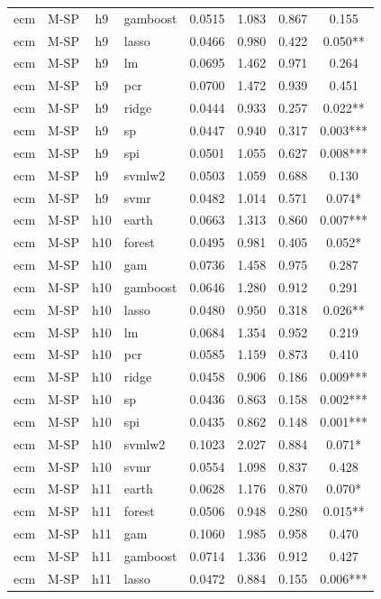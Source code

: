 \begin{ThreePartTable}
\begin{longtable}[t]{llclcccc}
ecm & M-SP & h9 & gamboost & 0.0515 & 1.083 & 0.867 & 0.155\\
ecm & M-SP & h9 & lasso & 0.0466 & 0.980 & 0.422 & 0.050**\\
ecm & M-SP & h9 & lm & 0.0695 & 1.462 & 0.971 & 0.264\\
ecm & M-SP & h9 & pcr & 0.0700 & 1.472 & 0.939 & 0.451\\
ecm & M-SP & h9 & ridge & 0.0444 & 0.933 & 0.257 & 0.022**\\
ecm & M-SP & h9 & sp & 0.0447 & 0.940 & 0.317 & 0.003***\\
ecm & M-SP & h9 & spi & 0.0501 & 1.055 & 0.627 & 0.008***\\
ecm & M-SP & h9 & svmlw2 & 0.0503 & 1.059 & 0.688 & 0.130\\
ecm & M-SP & h9 & svmr & 0.0482 & 1.014 & 0.571 & 0.074*\\
\addlinespace
ecm & M-SP & h10 & earth & 0.0663 & 1.313 & 0.860 & 0.007***\\
ecm & M-SP & h10 & forest & 0.0495 & 0.981 & 0.405 & 0.052*\\
ecm & M-SP & h10 & gam & 0.0736 & 1.458 & 0.975 & 0.287\\
ecm & M-SP & h10 & gamboost & 0.0646 & 1.280 & 0.912 & 0.291\\
ecm & M-SP & h10 & lasso & 0.0480 & 0.950 & 0.318 & 0.026**\\
ecm & M-SP & h10 & lm & 0.0684 & 1.354 & 0.952 & 0.219\\
ecm & M-SP & h10 & pcr & 0.0585 & 1.159 & 0.873 & 0.410\\
ecm & M-SP & h10 & ridge & 0.0458 & 0.906 & 0.186 & 0.009***\\
ecm & M-SP & h10 & sp & 0.0436 & 0.863 & 0.158 & 0.002***\\
ecm & M-SP & h10 & spi & 0.0435 & 0.862 & 0.148 & 0.001***\\
ecm & M-SP & h10 & svmlw2 & 0.1023 & 2.027 & 0.884 & 0.071*\\
ecm & M-SP & h10 & svmr & 0.0554 & 1.098 & 0.837 & 0.428\\
\addlinespace
ecm & M-SP & h11 & earth & 0.0628 & 1.176 & 0.870 & 0.070*\\
ecm & M-SP & h11 & forest & 0.0506 & 0.948 & 0.280 & 0.015**\\
ecm & M-SP & h11 & gam & 0.1060 & 1.985 & 0.958 & 0.470\\
ecm & M-SP & h11 & gamboost & 0.0714 & 1.336 & 0.912 & 0.427\\
ecm & M-SP & h11 & lasso & 0.0472 & 0.884 & 0.155 & 0.006***\\

\end{longtable}
\end{ThreePartTable}
